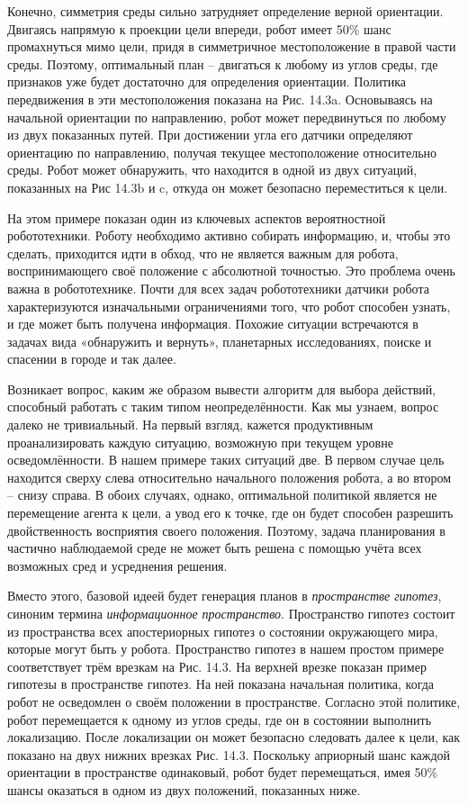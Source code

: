 \documentclass[10pt,a4paper]{article}
\begin{document}
Конечно, симметрия среды сильно затрудняет определение верной ориентации. Двигаясь напрямую к проекции цели впереди, робот имеет 50\% шанс промахнуться мимо цели, придя в симметричное местоположение в правой части среды. Поэтому, оптимальный план – двигаться к любому из углов среды, где признаков уже будет достаточно для определения ориентации. Политика передвижения в эти местоположения показана на Рис. 14.3a. Основываясь на начальной ориентации по направлению, робот может передвинуться по любому из двух показанных путей. При достижении угла его датчики определяют ориентацию по направлению, получая текущее местоположение относительно среды. Робот может обнаружить, что находится в одной из двух ситуаций, показанных на Рис 14.3b и c, откуда он может безопасно переместиться к цели.

На этом примере показан один из ключевых аспектов вероятностной робототехники. Роботу необходимо активно собирать информацию, и, чтобы это сделать, приходится идти в обход, что не является важным для робота, воспринимающего своё положение с абсолютной точностью. Это проблема очень важна в робототехнике. Почти для всех задач робототехники датчики робота характеризуются изначальными ограничениями того, что робот способен узнать, и где может быть получена информация. Похожие ситуации встречаются в задачах вида «обнаружить и вернуть», планетарных исследованиях, поиске и спасении в городе и так далее.

Возникает вопрос, каким же образом вывести алгоритм для выбора действий, способный работать с таким типом неопределённости. Как мы узнаем, вопрос далеко не тривиальный. На первый взгляд, кажется продуктивным проанализировать каждую ситуацию, возможную при текущем уровне осведомлённости. В нашем примере таких ситуаций две. В первом случае цель находится сверху слева относительно начального положения робота, а во втором – снизу справа. В обоих случаях, однако, оптимальной политикой является не перемещение агента к цели, а увод его к точке, где он будет способен разрешить двойственность восприятия своего положения. Поэтому, задача планирования в частично наблюдаемой среде не может быть решена с помощью учёта всех возможных сред и усреднения решения.

Вместо этого, базовой идеей будет генерация планов в \textit{пространстве гипотез}, синоним термина \textit{информационное пространство}. Пространство гипотез состоит из пространства всех апостериорных гипотез о состоянии окружающего мира, которые могут быть у робота. Пространство гипотез в нашем простом примере соответствует трём врезкам на Рис. 14.3. На верхней врезке показан пример гипотезы в пространстве гипотез. На ней показана начальная политика, когда робот не осведомлен о своём положении в пространстве. Согласно этой политике, робот перемещается к одному из углов среды, где он в состоянии выполнить локализацию. После локализации он может безопасно следовать далее к цели, как показано на двух нижних врезках Рис. 14.3. Поскольку априорный шанс каждой ориентации в пространстве одинаковый, робот будет перемещаться, имея 50\% шансы оказаться в одном из двух положений, показанных ниже.
\end{document}
